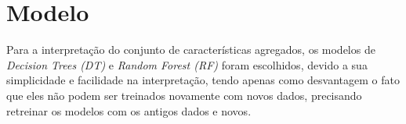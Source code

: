 \section{Modelo}

Para a interpretação do conjunto de características 
agregados, os modelos de \emph{Decision Trees (DT)} e 
\emph{Random Forest (RF)} foram escolhidos, devido a 
sua simplicidade e facilidade na interpretação, tendo apenas 
como desvantagem o fato que eles não podem ser treinados 
novamente com novos dados, precisando retreinar os modelos 
com os antigos dados e novos.